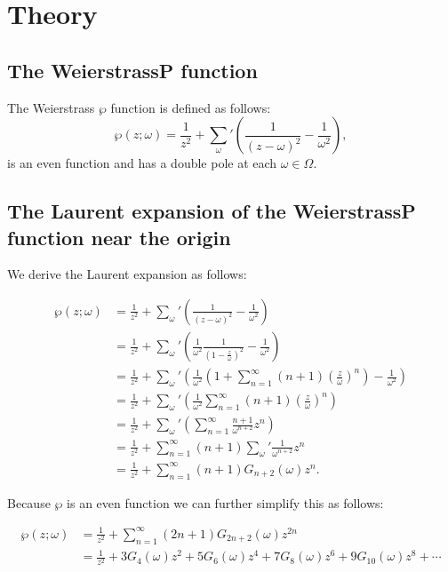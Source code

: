 \newpage
\section{Theory}

\subsection{The WeierstrassP function}

The Weierstrass $\wp$ function is defined as follows:
\[
    \wp(z; \omega) = \frac{1}{z^2} + \sum_{\omega}{'} ( \frac{1}{(z-\omega)^2} - \frac{1}{\omega^2} ) ,
\]
is an even function and has a double pole at each $\omega \in \Omega$.


\subsection{The Laurent expansion of the WeierstrassP function near the origin}

We derive the Laurent expansion as follows:

\begin{align*}
    \wp(z; \omega) &= \frac{1}{z^2} + \sum_{\omega}{'} ( \frac{1}{(z-\omega)^2} - \frac{1}{\omega^2} )  \\
    &= \frac{1}{z^2} + \sum_{\omega}{'} ( \frac{1}{\omega^2} \frac{1}{(1-\frac{z}{\omega})^2} - \frac{1}{\omega^2} )  \\
    &= \frac{1}{z^2} + \sum_{\omega}{'} ( \frac{1}{\omega^2} ( 1 + \sum_{n=1}^{\infty} (n+1)( \frac{z}{\omega} )^n ) - \frac{1}{\omega^2} )  \\
    &= \frac{1}{z^2} + \sum_{\omega}{'} ( \frac{1}{\omega^2} \sum_{n=1}^{\infty} (n+1)( \frac{z}{\omega} )^n )  \\
    &= \frac{1}{z^2} + \sum_{\omega}{'} ( \sum_{n=1}^{\infty} \frac{n+1}{\omega^{n+2}}z^n )  \\
    &= \frac{1}{z^2} + \sum_{n=1}^{\infty} (n+1) \sum_{\omega}{'} \frac{1}{\omega^{n+2}}z^n  \\
    &= \frac{1}{z^2} + \sum_{n=1}^{\infty} (n+1) G_{n+2}(\omega) z^n .
\end{align*}

Because $\wp$ is an even function we can further simplify this as follows:

\begin{align*}
    \wp(z; \omega) &= \frac{1}{z^2} + \sum_{n=1}^{\infty} (2n+1) G_{2n+2}(\omega) z^{2n} \\
    &= \frac{1}{z^2} + 3 G_4(\omega) z^2 + 5 G_6(\omega) z^4 +7 G_8(\omega) z^6 + 9 G_{10}(\omega)z^8 + \cdots
\end{align*}


